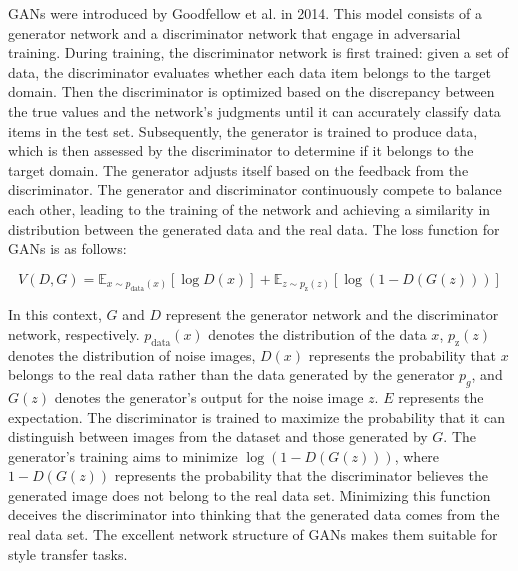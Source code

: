 \documentclass[preprint,12pt]{elsarticle}
\begin{document}
GANs were introduced by Goodfellow et al. in 2014\citep{36goodfellow2020generative}. This model consists of a generator network and a discriminator network that engage in adversarial training. During training, the discriminator network is first trained: given a set of data, the discriminator evaluates whether each data item belongs to the target domain. Then the discriminator is optimized based on the discrepancy between the true values and the network's judgments until it can accurately classify data items in the test set. Subsequently, the generator is trained to produce data, which is then assessed by the discriminator to determine if it belongs to the target domain. The generator adjusts itself based on the feedback from the discriminator. The generator and discriminator continuously compete to balance each other, leading to the training of the network and achieving a similarity in distribution between the generated data and the real data. The loss function for GANs is as follows:

\begin{equation}
    \label{GAN_loss}
    V(D,G)=\mathbb{E}_{x\sim p_{\text{data}}(x)}\left[\log D(x)\right]+\mathbb{E}_{z\sim p_{\text{z}}(z)}\left[\log \left(1-D(G(z))\right)\right]
\end{equation}

In this context, $G$ and $D$ represent the generator network and the discriminator network, respectively. $p_{\text{data}}(x)$ denotes the distribution of the data $x$, $p_{\text{z}}(z)$ denotes the distribution of noise images, $D(x)$ represents the probability that $x$ belongs to the real data rather than the data generated by the generator $p_g$, and $G(z)$ denotes the generator's output for the noise image $z$. $E$ represents the expectation. The discriminator is trained to maximize the probability that it can distinguish between images from the dataset and those generated by $G$. The generator's training aims to minimize $\log \left(1-D(G(z))\right)$, where $1-D(G(z))$ represents the probability that the discriminator believes the generated image does not belong to the real data set. Minimizing this function deceives the discriminator into thinking that the generated data comes from the real data set. The excellent network structure of GANs makes them suitable for style transfer tasks.
\end{document}
